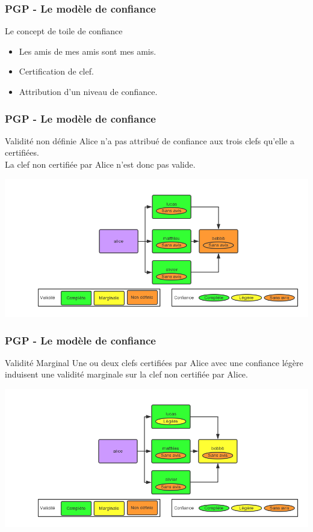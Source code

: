 \begin{frame}
  \frametitle{\color{white}PGP - Le modèle de confiance}
    \begin{block}{Le concept de toile de confiance}
    	\begin{itemize}
	  \item Les amis de mes amis sont mes amis.
	  \item Certification de clef.
	  \item Attribution d'un niveau de confiance.
       \end{itemize} 
    \end{block}
\end{frame}
\begin{frame}
  \frametitle{\color{white}PGP - Le modèle de confiance}
    \begin{block}{Validité non définie}
      Alice n'a pas attribué de confiance aux trois clefs qu'elle a certifiées.\\
      La clef non certifiée par Alice n'est donc pas valide.
    \end{block}
    \includegraphics[scale=0.3]{tdcdemoUndefined.png}
\end{frame}
\begin{frame}
  \frametitle{\color{white}PGP - Le modèle de confiance}
    \begin{block}{Validité Marginal}
      Une ou deux clefs certifiées par Alice avec une confiance légère 
      induisent une validité marginale sur la clef non certifiée par Alice.
    \end{block}
    \includegraphics[scale=0.3]{tdcdemoMarginal.png}
\end{frame}
